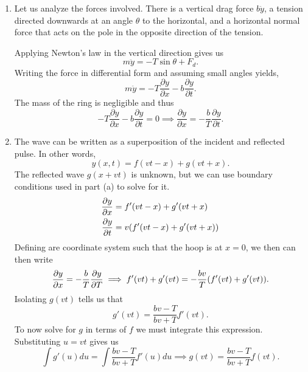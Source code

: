 \begin{sol}
\begin{enumerate}[label=\textbf{(\alph*)}] 
\item Let us analyze the forces involved. There is a vertical drag force $b\ddot{y}$, a tension directed downwards at an angle $\theta$ to the horizontal, and a horizontal normal force that acts on the pole in the opposite direction of the tension. 
\vspace{3mm}

\noindent Applying Newton's law in the vertical direction gives us 
\[m\ddot{y} = -T\sin\theta + F_d.\]
Writing the force in differential form and assuming small angles yields,
\[m\ddot{y} = -T\frac{\partial y}{\partial x} - b\frac{\partial y}{\partial t}.\]
The mass of the ring is negligible and thus 
\[-T\frac{\partial y}{\partial x} - b \frac{\partial y}{\partial t} = 0 \implies \boxed{\frac{\partial y}{\partial x} = -\frac{b}{T}\frac{\partial y}{\partial t}}.\]

\item The wave can be written as a superposition of the incident and reflected pulse. In other words, 
\[y (x,t) = f(vt - x) + g(vt + x).\]
The reflected wave $g(x + vt)$ is unknown, but we can use boundary conditions used in part (a) to solve for it. 
\begin{align*}
    \pdv{y}{x} &= f' (vt - x) + g' (vt + x) \\
    \pdv{y}{t} &= v (f' ( vt - x) + g' (vt + x))
\end{align*}
Defining are coordinate system such that the hoop is at $x = 0$, we then can then write 
\[\pdv{y}{x} = -\frac{b}{T}\pdv{y}{T}\implies f' (vt) + g' (vt) = -\frac{bv}{T} (f' ( vt) + g' (vt)).\]
Isolating $g(vt)$ tells us that 
\[g'(vt) = \frac{bv - T}{bv + T}f' (vt).\]
To now solve for $g$ in terms of $f$ we must integrate this expression. Substituting $u = vt$ gives us 
\[\int g' (u) du = \int \frac{bv - T}{bv + T}f' (u) du \implies g (vt) = \boxed{\frac{bv - T}{bv + T} f(vt)}.\]
\end{enumerate}
\end{sol}
